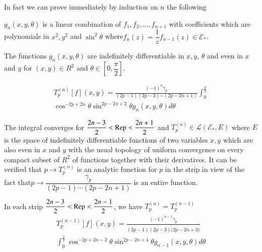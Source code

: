 In fact we can prove immediately  by induction on $n$ the following 
\setcounter{lem}{0}
\begin{lem}\label{part1:chap4:sec3:lem1}%
  $g_n (x, y, \theta)$ is a linear combination of $f_1,  f_2, \ldots,
  f_{n+1}$ with coefficients which are polynomials in $x^2, y^2 $ and
  $\sin^2 \theta $ where\pageoriginale $f_n (z) = \dfrac{1}{z} f_{n-1} (z) \in
  \mathscr{E}_{*}$. 
\end{lem}

\begin{coro*}
  The functions $g_n (x, y, \theta )$ are indefinitely  differentiable
  in $x, y$, $\theta $ and even in $x$ and $y$ for $(x, y) \in R^2$ and
  $\theta  \in [0,  \dfrac{\pi}{2}]$. 
\end{coro*}

\begin{defi*}
\begin{multline*}
  T_p^{(n)}[f] (x, y) =
  \frac{(-1)^n \gamma_p}{(2p-1)(2p-3) \cdots (2p - 2n+1)}
  \int^{\frac{\pi}{2}}_0 \\
  \cos^{-2p + 2n} \theta  \sin^{2p-2n+2} \theta 
  g_n (x, y,  \theta  ) d \theta  
\end{multline*}

The integral converges for $\dfrac{2n-3}{2}< \operatorname{Rep} < \dfrac{2n+1}{2}$
and $T^{(n)}_p \in\mathscr{L} (\mathscr{E}_{*}, E)$ where $E$ is the
space of indefinitely differentiable functions of two variables $x, y$
which are also even in $x$ and $y$ with the usual topology of uniform
convergence on every compact subset of $R^2$ of functions together
with their derivatives. It can be verified that $p \to T^{(n)}_{p}$ is
an analytic function for $p$ in the strip in view of the fact
that\hfill \break  $p
\to \dfrac{\gamma _p}{(2p -1) \cdots (2p - 2n + 1)}$ is an entire
function. 
\end{defi*}

\begin{lem}\label{part1:chap4:sec3:lem2}%
  In each strip $\dfrac{2n-3}{2}< \operatorname{Rep} < \dfrac{2n -1}{2}$, we have
  \break $T^{(n)}_p = T^{(n-1)}_{p}$  
  \begin{multline*}
  T^{(n-1)}_p  [f] (x, y) = \frac{(-1)^{n-1} \gamma _p}{(2p-1)(2p-3
    )\dot \dot (2p - 2n +3)}\\ 
  \int^{\frac{\pi}{2}}_{0}\cos^{-2p + 2n -
    2} \theta  \sin^{2p-2n+4} \theta  g_{n-1} (x, y,  \theta ) d \theta  
  \end{multline*}
\end{lem}

